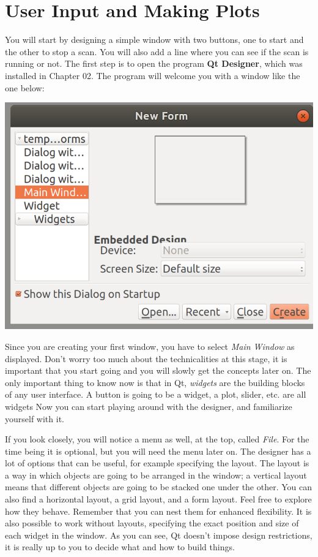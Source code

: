 \chapter{User Input and Making Plots}\label{chapter:user-input}

You will start by designing a simple window with two buttons, one to
start and the other to stop a scan. You will also add a line where you
can see if the scan is running or not. The first step is to open the
program \textbf{Qt Designer}, which was installed in Chapter 02. The
program will welcome you with a window like the one below:

\begin{center}
    \includegraphics[width=.6\textwidth]{images/qt_designer_welcome.png}
\end{center}

Since you are creating your first window, you have to select \emph{Main
Window} as displayed. Don't worry too much about the technicalities at
this stage, it is important that you start going and you will slowly get
the concepts later on. The only important thing to know now is that in
Qt, \emph{widgets} are the building blocks of any user interface. A
button is going to be a widget, a plot, slider, etc. are all widgets Now
you can start playing around with the designer, and familiarize yourself
with it.



If you look closely, you will notice a menu as well, at the top, called
\emph{File}. For the time being it is optional, but you will need the
menu later on. The designer has a lot of options that can be useful, for
example specifying the layout. The layout is a way in which objects are
going to be arranged in the window; a vertical layout means that
different objects are going to be stacked one under the other. You can
also find a horizontal layout, a grid layout, and a form layout. Feel
free to explore how they behave. Remember that you can nest them for
enhanced flexibility. It is also possible to work without layouts,
specifying the exact position and size of each widget in the window. As
you can see, Qt doesn't impose design restrictions, it is really up to
you to decide what and how to build things.

